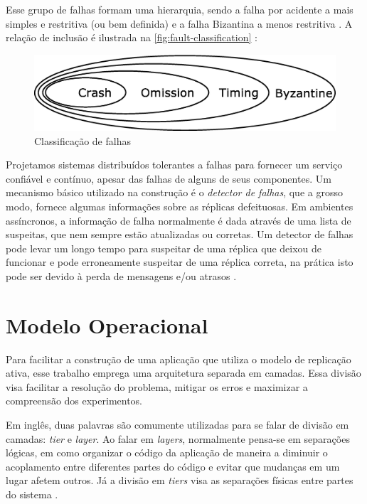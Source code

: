 Esse grupo de falhas formam uma hierarquia, sendo a falha por acidente a mais simples e
restritiva (ou bem definida) e a falha Bizantina a menos restritiva \cite{jalote94}. A
relação de inclusão é ilustrada na \autoref{fig:fault-classification} \cite{cristian86}:

\begin{figure}[htbp]
  \centering
  \includegraphics[width=13cm]{conteudo/capitulos/figuras/classificacao_falhas.eps}
  \caption{Classificação de falhas}
  \label{fig:fault-classification}
\end{figure}

Projetamos sistemas distribuídos tolerantes a falhas para fornecer um serviço confiável e
contínuo, apesar das falhas de alguns de seus componentes. Um mecanismo básico utilizado
na construção é o \emph{detector de falhas}, que a grosso modo, fornece algumas
informações sobre as réplicas defeituosas. Em ambientes assíncronos, a informação de falha
normalmente é dada através de uma lista de suspeitas, que nem sempre estão atualizadas ou
corretas. Um detector de falhas pode levar um longo tempo para suspeitar de uma réplica
que deixou de funcionar e pode erroneamente suspeitar de uma réplica correta, na prática
isto pode ser devido à perda de mensagens e/ou atrasos \cite{chandra96, chen02}.


\section{Modelo Operacional}

Para facilitar a construção de uma aplicação que utiliza o modelo de replicação ativa,
esse trabalho emprega uma arquitetura separada em camadas. Essa divisão visa facilitar
a resolução do problema, mitigar os erros e maximizar a compreensão dos experimentos.

Em inglês, duas palavras são comumente utilizadas para se falar de divisão em camadas:
\emph{tier} e \emph{layer}. Ao falar em \emph{layers}, normalmente pensa-se em separações
lógicas, em como organizar o código da aplicação de maneira a diminuir o acoplamento
entre diferentes partes do código e evitar que mudanças em um lugar afetem outros. Já a
divisão em \emph{tiers} visa as separações físicas entre partes do sistema
\cite{caelum11}.

